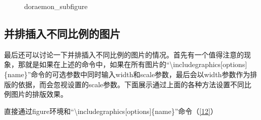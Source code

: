 \documentclass{article}
\begin{document}
\begin{figure}[htbp]
{\begin{subfigure}{.25\textwidth}
            \end{subfigure}
        }
        \hfill
        \hfill
        \caption{doraemon\_subfigure}
        \label{11}
    \end{figure}

\subsection{并排插入不同比例的图片}
    最后还可以讨论一下并排插入不同比例的图片的情况。首先有一个值得注意的现象，那就是如果在上述的命令中，如果在所有图片的``\textbackslash includegraphics[options]\{name\}''命令的可选参数中同时输入width和scale参数，最后会以width参数作为排版的依据，而会忽视设置的scale参数。下面展示通过上面的各种方法设置不同比例图片的排版效果。

    直接通过figure环境和``\textbackslash includegraphics[options]\{name\}''命令（\ref{12}）
\end{document}
